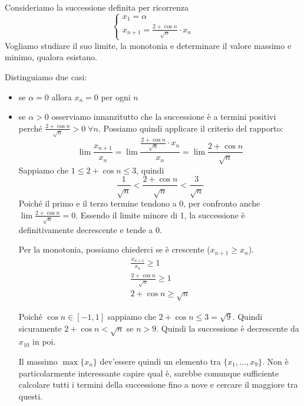 \begin{example}
Consideriamo la successione definita per ricorrenza
\begin{equation*}
\begin{cases}
x_1 = \alpha \\
x_{n+1} = \frac{2 + \cos n}{\sqrt{n}} \cdot x_n
\end{cases}
\end{equation*}
Vogliamo studiare il suo limite, la monotonia e determinare il valore massimo e minimo, qualora esistano.

Distinguiamo due casi:
\begin{itemize}
\item se $\alpha = 0$ allora $x_n = 0$ per ogni $n$
\item se $\alpha > 0$ osserviamo innanzitutto che la successione è a termini positivi perché $\frac{2+\cos n}{\sqrt{n}} > 0 \; \forall n$. Possiamo quindi applicare il criterio del rapporto:
\begin{equation*}
\lim \frac{x_{n+1}}{x_n} = \lim \frac{\frac{2 + \cos n}{\sqrt{n}} \cdot x_n}{x_n} = \lim \frac{2 + \cos n}{\sqrt{n}}
\end{equation*}
Sappiamo che $1 \le 2 + \cos n \le 3$, quindi
\begin{equation*}
\frac{1}{\sqrt{n}} < \frac{2+\cos n}{\sqrt{n}} < \frac{3}{\sqrt{n}}
\end{equation*}
Poiché il primo e il terzo termine tendono a 0, per confronto anche $\lim \frac{2+\cos n}{\sqrt{n}} = 0$. Essendo il limite minore di 1, la successione è definitivamente decrescente e tende a 0.

Per la monotonia, possiamo chiederci se è crescente ($x_{n+1} \ge x_n$).
\begin{gather*}
\frac{x_{n+1}}{x_n} \ge 1 \\
\frac{2 + \cos n}{\sqrt{n}} \ge 1 \\
2 + \cos n \ge \sqrt{n}
\end{gather*}

Poiché $\cos n \in [-1, 1]$ sappiamo che $2 + \cos n \le 3 = \sqrt{9}$. Quindi sicuramente $2 + \cos n < \sqrt{n}$ se $n > 9$. Quindi la successione è decrescente da $x_{10}$ in poi.

Il massimo $\max \{x_n\}$ dev'essere quindi un elemento tra $\{x_1, \ldots, x_9\}$. Non è particolarmente interessante capire qual è, sarebbe comunque sufficiente calcolare tutti i termini della successione fino a nove e cercare il maggiore tra questi.
\end{itemize}
\end{example}

